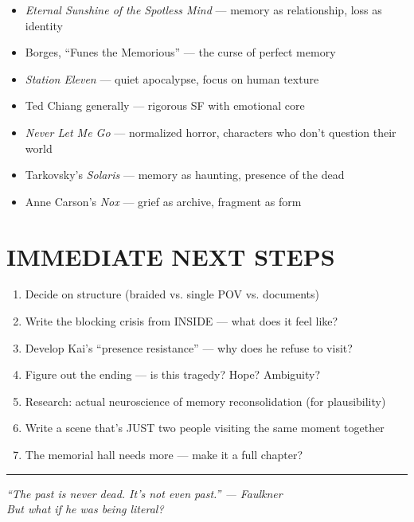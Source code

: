 \documentclass[11pt,letterpaper]{article}
\begin{document}
\begin{itemize}[leftmargin=*]
    \item \textit{Eternal Sunshine of the Spotless Mind} --- memory as relationship, loss as identity
    \item Borges, ``Funes the Memorious'' --- the curse of perfect memory
    \item \textit{Station Eleven} --- quiet apocalypse, focus on human texture
    \item Ted Chiang generally --- rigorous SF with emotional core
    \item \textit{Never Let Me Go} --- normalized horror, characters who don't question their world
    \item Tarkovsky's \textit{Solaris} --- memory as haunting, presence of the dead
    \item Anne Carson's \textit{Nox} --- grief as archive, fragment as form
\end{itemize}

\vspace{1em}

\section*{IMMEDIATE NEXT STEPS}

\begin{enumerate}[leftmargin=*]
    \item[$\square$] Decide on structure (braided vs. single POV vs. documents)
    \item[$\square$] Write the blocking crisis from INSIDE --- what does it feel like?
    \item[$\square$] Develop Kai's ``presence resistance'' --- why does he refuse to visit?
    \item[$\square$] Figure out the ending --- is this tragedy? Hope? Ambiguity?
    \item[$\square$] Research: actual neuroscience of memory reconsolidation (for plausibility)
    \item[$\square$] Write a scene that's JUST two people visiting the same moment together
    \item[$\square$] The memorial hall needs more --- make it a full chapter?
\end{enumerate}

\vspace{2em}
\hrule
\vspace{1em}

\begin{center}
\textit{``The past is never dead. It's not even past.'' --- Faulkner}\\[0.5em]
\textit{But what if he was being literal?}
\end{center}
\end{document}
